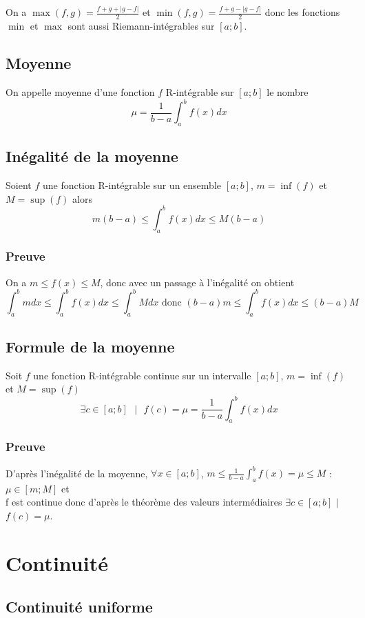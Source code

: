 \documentclass[a4paper,10pt]{book} %
\begin{document}
On a $\max(f,g)=\frac{f+g+|g-f|}{2}$ et $\min(f,g)=\frac{f+g-|g-f|}{2}$ donc les fonctions $\min$ et $\max$ sont aussi Riemann-intégrables sur $[a;b]$.

\subsection{Moyenne}
On appelle moyenne d'une fonction $f$ R-intégrable sur $[a;b]$ le nombre $$\mu=\frac{1}{b-a}\displaystyle\int_{a}^{b}f(x)dx$$

\subsection{Inégalité de la moyenne}
Soient $f$ une fonction R-intégrable sur un ensemble $[a;b]$, $m=\inf(f)$ et $M=\sup(f)$ alors $$m(b-a)\leq \displaystyle\int_{a}^{b} f(x)dx\leq M(b-a)$$

\subsubsection{Preuve}
On a $m\leq f(x)\leq M$, donc avec un passage à l'inégalité on obtient $$\displaystyle\int_{a}^{b}mdx\leq\int_{a}^{b}f(x)dx\leq\int_{a}^{b}Mdx\text{ donc }(b-a)m\leq\int_{a}^{b}f(x)dx\leq (b-a)M$$

\subsection{Formule de la moyenne}
Soit $f$ une fonction R-intégrable continue sur un intervalle $[a;b]$, $m=\inf(f)$ et $M=\sup(f)$ $$\exists c\in [a;b]\text{ }|\text{ }f(c)=\mu=\frac{1}{b-a}\displaystyle\int_{a}^{b}f(x)dx$$

\subsubsection{Preuve}
D'après l'inégalité de la moyenne, $\forall x\in [a;b]$, $m\leq \frac{1}{b-a}\displaystyle\int_a^bf(x)=\mu\leq M$ : $\mu \in [m;M]$ et\\
f est continue donc d'après le théorème des valeurs intermédiaires $\exists c\in [a;b]$ $|$ $f(c)=\mu$.

\newpage

\section{Continuité}
\subsection{Continuité uniforme}
\end{document}
